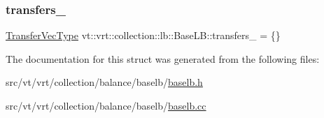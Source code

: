 \mbox{\label{structvt_1_1vrt_1_1collection_1_1lb_1_1_base_l_b_a815315640fe4e41e39d1872e115b8574}} 
\subsubsection{\texorpdfstring{transfers\+\_\+}{transfers\_}}
{\footnotesize\ttfamily \hyperlink{structvt_1_1vrt_1_1collection_1_1lb_1_1_base_l_b_a329e8179ec41a1bd4924c79fe23a79af}{Transfer\+Vec\+Type} vt\+::vrt\+::collection\+::lb\+::\+Base\+L\+B\+::transfers\+\_\+ = \{\}\hspace{0.3cm}{\ttfamily [private]}}



The documentation for this struct was generated from the following files\+:\begin{DoxyCompactItemize}
\item 
src/vt/vrt/collection/balance/baselb/\hyperlink{baselb_8h}{baselb.\+h}\item 
src/vt/vrt/collection/balance/baselb/\hyperlink{baselb_8cc}{baselb.\+cc}\end{DoxyCompactItemize}
